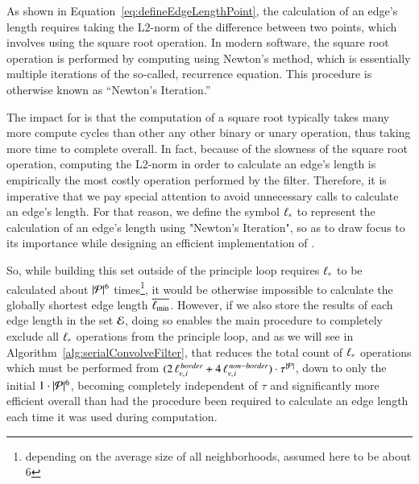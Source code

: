 As shown in Equation~\ref{eq:defineEdgeLengthPoint}, the calculation of an edge's length requires taking the L2-norm of the difference between two points, which involves using the square root operation. In modern software, the square root operation is performed by computing using Newton's method, which is essentially multiple iterations of the so-called, recurrence equation. This procedure is otherwise known as ``Newton's Iteration.'' ~\cite{Weisstein19b}

The impact for  is that the computation of a square root typically takes many more compute cycles than other any other binary or unary operation, thus taking more time to complete overall. In fact, because of the slowness of the square root operation, computing the L2-norm in order to calculate an edge's length is empirically the most costly operation performed by the filter. Therefore, it is imperative that we pay special attention to avoid unnecessary calls to calculate an edge's length. For that reason, we define the symbol $\ell_\ast$ to represent the calculation of an edge's length using "Newton's Iteration", so as to draw focus to its importance while designing an efficient implementation of .

So, while building this set outside of the principle loop requires ${\ell_\ast}$ to be calculated about $|\mathcal{P}|^6$ times\footnote{depending on the average size of all neighborhoods, assumed here to be about 6}, it would be otherwise impossible to calculate the globally shortest edge length $\overline{\ell_\text{min}}$. However, if we also store the results of each edge length in the set $\mathcal{E}$, doing so enables the main procedure to completely exclude all $\ell_\ast$ operations from the principle loop, and as we will see in Algorithm~\ref{alg:serialConvolveFilter}, that reduces the total count of $\ell_\ast$ operations which must be performed from $(2\,\ell_{v,\kern.75pt i}^{\,border} + 4\,\ell_{v,\kern.75pt i}^{\,non-border})\cdot\tau^{|\mathcal{P}|}$, down to only the initial $1\cdot |\mathcal{P}|^6$, becoming completely independent of $\tau$ and significantly more efficient overall than had the procedure been required to calculate an edge length each time it was used during computation.%
%
%

